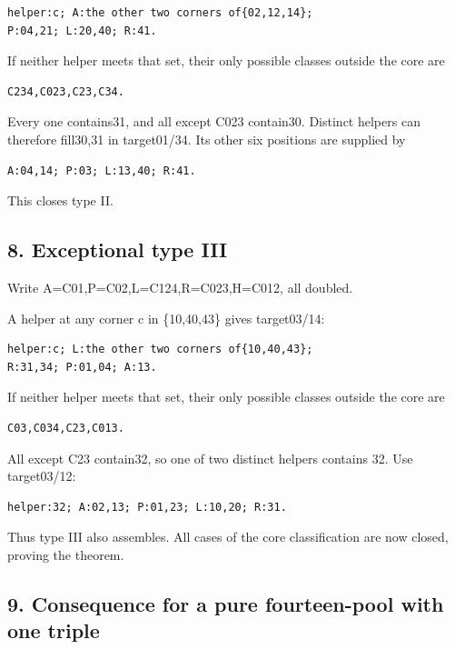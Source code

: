 \documentclass[
  10pt,
]{article}
\begin{document}
\begin{verbatim}
helper:c; A:the other two corners of{02,12,14};
P:04,21; L:20,40; R:41.
\end{verbatim}

If neither helper meets that set, their only possible classes outside
the core are

\begin{verbatim}
C234,C023,C23,C34.
\end{verbatim}

Every one contains31, and all except C023 contain30. Distinct helpers
can therefore fill30,31 in target01/34. Its other six positions are
supplied by

\begin{verbatim}
A:04,14; P:03; L:13,40; R:41.
\end{verbatim}

This closes type II.

\hypertarget{exceptional-type-iii}{%
\subsection*{8. Exceptional type III}\label{exceptional-type-iii}}

Write A=C01,P=C02,L=C124,R=C023,H=C012, all doubled.

A helper at any corner c in \{10,40,43\} gives target03/14:

\begin{verbatim}
helper:c; L:the other two corners of{10,40,43};
R:31,34; P:01,04; A:13.
\end{verbatim}

If neither helper meets that set, their only possible classes outside
the core are

\begin{verbatim}
C03,C034,C23,C013.
\end{verbatim}

All except C23 contain32, so one of two distinct helpers contains 32.
Use target03/12:

\begin{verbatim}
helper:32; A:02,13; P:01,23; L:10,20; R:31.
\end{verbatim}

Thus type III also assembles. All cases of the core classification are
now closed, proving the theorem.

\hypertarget{consequence-for-a-pure-fourteen-pool-with-one-triple}{%
\subsection*{9. Consequence for a pure fourteen-pool with one
triple}\label{consequence-for-a-pure-fourteen-pool-with-one-triple}}
\end{document}
